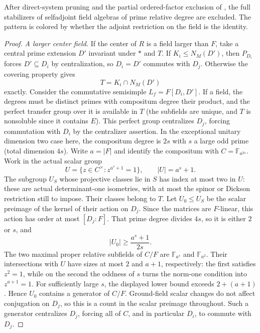 \begin{proposition}\label{c:isometry-fields}
After direct-system pruning and the partial ordered-factor exclusion of , the full stabilizers of selfadjoint field algebras of prime relative degree are excluded. The pattern is colored by whether the adjoint restriction on the field is the identity.
\end{proposition}

\begin{proof}
\textit{A larger center field.} If the center of \(R\) is a field larger than \(F\), take a central prime extension \(D'\) invariant under \(*\) and \(T\). If \(K_i\le N_M(D')\), then \(P_{D_i}\) forces \(D'\subseteq D_i\) by centralization, so \(D_i=D'\) commutes with \(D_j\). Otherwise the covering property gives
\[
 T=K_i\cap N_M(D')
\]
exactly. Consider the commutative semisimple \(L_f=F[D_i,D']\). If a field, the degrees must be distinct primes with compositum degree their product, and the perfect transfer group over it is available in \(T\) (the subfields are unique, and \(T\) is nonsoluble since it contains \(E\)). This perfect group centralizes \(D_j\), forcing commutation with \(D_i\) by the centralizer assertion. In the exceptional unitary dimension two case here, the compositum degree is \(2s\) with \(s\) a large odd prime (total dimension \(4s\)). Write \(a=|F|\) and identify the compositum with \(C=\mathbb F_{a^{2s}}\). Work in the actual scalar group
\[
 U=\{z\in C^\times:z^{a^s+1}=1\},\qquad |U|=a^s+1.
\]
The subgroup \(U_S\) whose projective classes lie in \(S\) has index at most two in \(U\): these are actual determinant-one isometries, with at most the spinor or Dickson restriction still to impose. Their classes belong to \(T\). Let \(U_0\le U_S\) be the scalar preimage of the kernel of their action on \(D_j\). Since the matrices are \(F\)-linear, this action has order at most \([D_j:F]\). That prime degree divides \(4s\), so it is either \(2\) or \(s\), and
\[
 |U_0|\ge\frac{a^s+1}{2s}.
\]
The two maximal proper relative subfields of \(C/F\) are \(\mathbb F_{a^s}\) and \(\mathbb F_{a^2}\). Their intersections with \(U\) have sizes at most \(2\) and \(a+1\), respectively: the first satisfies \(z^2=1\), while on the second the oddness of \(s\) turns the norm-one condition into \(z^{a+1}=1\). For sufficiently large \(s\), the displayed lower bound exceeds \(2+(a+1)\). Hence \(U_0\) contains a generator of \(C/F\). Ground-field scalar changes do not affect conjugation on \(D_j\), so this is a count in the scalar preimage throughout. Such a generator centralizes \(D_j\), forcing all of \(C\), and in particular \(D_i\), to commute with \(D_j\).


\end{proof}
